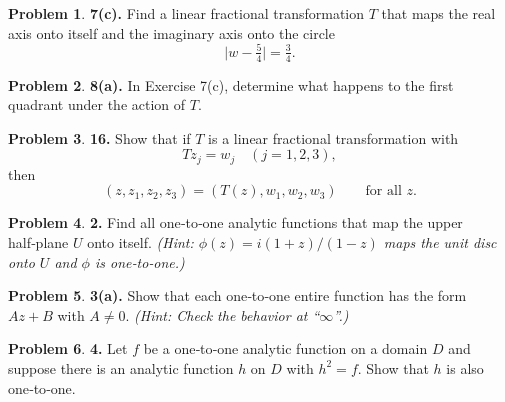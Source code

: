 \documentclass[10pt]{article}
\theoremstyle{definition} %
\newtheorem{problem}{Problem}
\theoremstyle{plain} %
\begin{document}
      \begin{problem}
      \textbf{7(c).} Find a linear fractional transformation \(T\) that maps the real axis onto itself and the imaginary axis onto the circle
      \[
        \lvert w-\tfrac{5}{4}\rvert = \tfrac{3}{4}.
      \]
      \end{problem}
      
      \begin{problem}
      \textbf{8(a).} In Exercise 7(c), determine what happens to the first quadrant under the action of \(T\).
      \end{problem}
      
      \begin{problem}
      \textbf{16.} Show that if \(T\) is a linear fractional transformation with
      \[
        Tz_j = w_j \quad (j = 1,2,3),
      \]
      then
      \[
        (z, z_1, z_2, z_3) = (T(z), w_1, w_2, w_3)
        \qquad\text{for all } z.
      \]
      \end{problem}
      \begin{problem}
        \textbf{2.} Find all one‑to‑one analytic functions that map the upper half‑plane \(U\) onto itself.  
        \emph{(Hint: \(\phi(z)=i(1+z)/(1-z)\) maps the unit disc onto \(U\) and \(\phi\) is one‑to‑one.)}
        \end{problem}
        
        \begin{problem}
        \textbf{3(a).} Show that each one‑to‑one entire function has the form \(Az+B\) with \(A\neq 0\).  
        \emph{(Hint: Check the behavior at “\(\infty\)”.)}
        \end{problem}
        
        \begin{problem}
        \textbf{4.} Let \(f\) be a one‑to‑one analytic function on a domain \(D\) and suppose there is an analytic function \(h\) on \(D\) with \(h^{2}=f\).  Show that \(h\) is also one‑to‑one.
        \end{problem}
        
\end{document}
